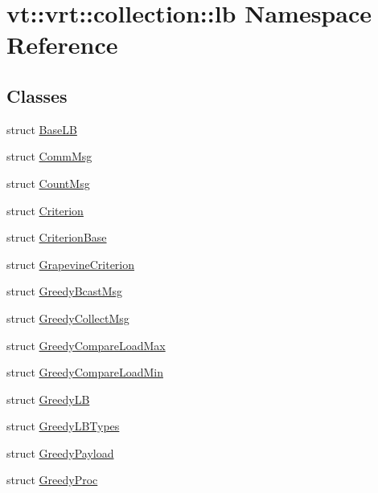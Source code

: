 \hypertarget{namespacevt_1_1vrt_1_1collection_1_1lb}{}\section{vt\+:\+:vrt\+:\+:collection\+:\+:lb Namespace Reference}
\label{namespacevt_1_1vrt_1_1collection_1_1lb}
\subsection*{Classes}
\begin{DoxyCompactItemize}
\item 
struct \hyperlink{structvt_1_1vrt_1_1collection_1_1lb_1_1_base_l_b}{Base\+LB}
\item 
struct \hyperlink{structvt_1_1vrt_1_1collection_1_1lb_1_1_comm_msg}{Comm\+Msg}
\item 
struct \hyperlink{structvt_1_1vrt_1_1collection_1_1lb_1_1_count_msg}{Count\+Msg}
\item 
struct \hyperlink{structvt_1_1vrt_1_1collection_1_1lb_1_1_criterion}{Criterion}
\item 
struct \hyperlink{structvt_1_1vrt_1_1collection_1_1lb_1_1_criterion_base}{Criterion\+Base}
\item 
struct \hyperlink{structvt_1_1vrt_1_1collection_1_1lb_1_1_grapevine_criterion}{Grapevine\+Criterion}
\item 
struct \hyperlink{structvt_1_1vrt_1_1collection_1_1lb_1_1_greedy_bcast_msg}{Greedy\+Bcast\+Msg}
\item 
struct \hyperlink{structvt_1_1vrt_1_1collection_1_1lb_1_1_greedy_collect_msg}{Greedy\+Collect\+Msg}
\item 
struct \hyperlink{structvt_1_1vrt_1_1collection_1_1lb_1_1_greedy_compare_load_max}{Greedy\+Compare\+Load\+Max}
\item 
struct \hyperlink{structvt_1_1vrt_1_1collection_1_1lb_1_1_greedy_compare_load_min}{Greedy\+Compare\+Load\+Min}
\item 
struct \hyperlink{structvt_1_1vrt_1_1collection_1_1lb_1_1_greedy_l_b}{Greedy\+LB}
\item 
struct \hyperlink{structvt_1_1vrt_1_1collection_1_1lb_1_1_greedy_l_b_types}{Greedy\+L\+B\+Types}
\item 
struct \hyperlink{structvt_1_1vrt_1_1collection_1_1lb_1_1_greedy_payload}{Greedy\+Payload}
\item 
struct \hyperlink{structvt_1_1vrt_1_1collection_1_1lb_1_1_greedy_proc}{Greedy\+Proc}
\item 

\end{DoxyCompactItemize}
